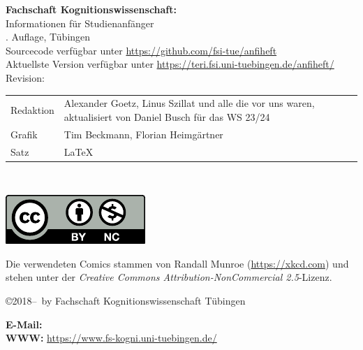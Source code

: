 \thispagestyle{empty}

\textbf{Fachschaft Kognitionswissenschaft:}\\
Informationen für Studienanfänger\\
\number\auflage. Auf\/lage, Tübingen \number\jahr\\[0.2cm]
{\footnotesize Sourcecode verfügbar unter \url{https://github.com/fsi-tue/anfiheft}\\
               Aktuellste Version verfügbar unter \url{https://teri.fsi.uni-tuebingen.de/anfiheft/}\\
	       Revision: \gitCommit\\[1cm]}


\begin{tabular}{ll}
	Redaktion & Alexander Goetz, Linus Szillat und alle die vor uns waren, aktualisiert von Daniel Busch für das WS 23/24\\ %
	Grafik & Tim Beckmann, Florian Heimgärtner \\
	Satz & \LaTeX
\end{tabular}\\

\vfill
\begin{minipage}[c]{0.1\textwidth}
	\includegraphics[width=\linewidth]{kogni/logos/by-nc.pdf}
\end{minipage}
\begin{minipage}[c]{0.9\textwidth}
	Die verwendeten Comics stammen von Randall Munroe (\url{https://xkcd.com}) und stehen unter der \emph{Creative Commons Attribution-NonCommercial 2.5}-Lizenz.
\end{minipage}

\copyright 2018--\number\jahr~by Fachschaft Kognitionswissenschaft Tübingen\\

\medskip

\textbf{E-Mail:} \hfill
{}\\
\textbf{WWW:} \hfill
\url{https://www.fs-kogni.uni-tuebingen.de/}
\newpage
